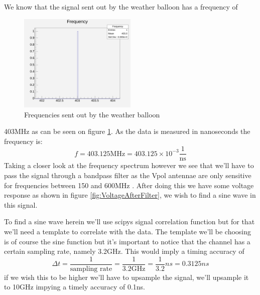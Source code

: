 \documentclass[11pt,a4paper,faculty=we,language=en,doctype=report]{cls/ugent-doc}
\begin{document}
We know that the signal sent out by the weather balloon has a frequency of
\begin{figure}
  \centering
  \includegraphics[width=0.5\textwidth]{Frequencies.pdf}
  \caption{Frequencies sent out by the weather balloon}
  \label{fig:BalloonFreq}
\end{figure}
403MHz as can be seen on figure \ref{fig:BalloonFreq}. 
As the data is measured in nanoseconds the frequency is:
\begin{equation}
	f = 403.125\text{MHz} = 403.125\times 10^{-3} \frac{1}{\text{ns}}
\end{equation}
Taking a closer look at the frequency spectrum however we see that we'll have
to pass the signal through a bandpass filter as the Vpol antennae are only
sensitive for frequencies between 150 and 600MHz \cite{Aguilar_2021}.  
After doing this we have some voltage response as shown in figure 
\ref{fig:VoltageAfterFilter}, we wish to find a sine wave in this signal.

To find a sine wave herein we'll use scipys signal correlation function but for that
we'll need a template to correlate with the data. The template we'll be choosing is
of course the sine function but it's important to notice that the channel has a certain
sampling rate, namely 3.2GHz. This would imply a timing accuracy of 
\begin{equation}
	\Delta t = \frac{1}{\text{sampling rate}} = \frac{1}{3.2\text{GHz}} = \frac{1}{3.2}ns = 0.3125ns 
\end{equation}
if we wish this to be higher we'll have to upsample the signal, we'll upsample it
to 10GHz impying a timely accuracy of 0.1ns.
\end{document}
